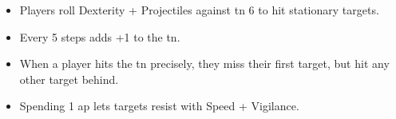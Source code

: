 \begin{itemize}
  \item
  Players roll Dexterity + Projectiles against \gls{tn} 6 to hit stationary targets.
  \item
  Every 5 steps adds +1 to the \gls{tn}.
  \item
  When a player hits the \gls{tn} precisely, they miss their first target, but hit any other target behind.
  \item
  Spending 1 \gls{ap} lets targets resist with Speed + Vigilance.
\end{itemize}

